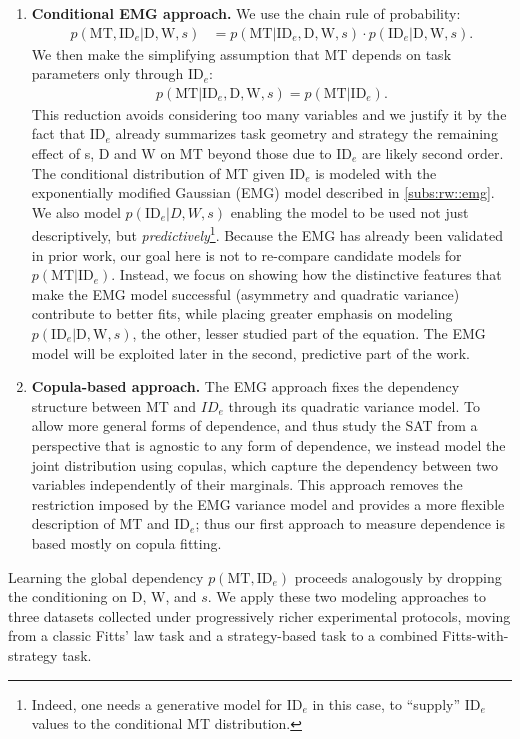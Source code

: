 \documentclass[acmlarge, manuscript,review]{acmart}
\newcommand{\mt}{\ensuremath{{\text{MT}}}\xspace}
\newcommand{\ide}{\ensuremath{{\text{ID}_e}}\xspace}
\newcommand{\D}{\ensuremath{{\text{D}}}\xspace}
\newcommand{\W}{\ensuremath{{\text{W}}}\xspace}
\begin{document}
\begin{enumerate}
	\item \textbf{Conditional EMG approach.}  
	We use the chain rule of probability:
	\begin{align}
		p(\mt, \ide | \D, \W, s) 
		&= p(\mt | \ide, \D, \W, s) \cdot{} p(\ide | \D, \W, s).\label{eq:chain_rule}
	\end{align}
	We then make the simplifying assumption that MT depends on task parameters only through \ide:
	\begin{align}
		p(\mt | \ide, \D, \W, s) = p(\mt | \ide).
	\end{align}
	This reduction avoids considering too many variables and we justify it by the fact that \ide already summarizes task geometry and strategy \ie the remaining effect of s, \D and \W on MT beyond those due to \ide are likely second order. 
	The conditional distribution of MT given \ide is modeled with the exponentially modified Gaussian (EMG) model described in \autoref{subs:rw::emg}. 
	We also model \(p(\ide | D, W, s)\) enabling the model to be used not just descriptively, but \textit{predictively}\footnote{Indeed, one needs a generative model for \ide in this case, to ``supply'' \ide values to the conditional MT distribution.}.
	Because the EMG has already been validated in prior work, our goal here is not to re-compare candidate models for $p(\mt|\ide)$. Instead, we focus on showing how the distinctive features that make the EMG model successful (asymmetry and quadratic variance) contribute to better fits, while placing greater emphasis on modeling $p(\ide| \D,\W,s)$, the other, lesser studied part of the equation. The EMG model will be exploited later in the second, predictive part of the work.
	
	\item \textbf{Copula-based approach.}  
	The EMG approach fixes the dependency structure between MT and \(ID_e\) through its quadratic variance model. 
	To allow more general forms of dependence, and thus study the SAT from a perspective that is agnostic to any form of dependence, we instead model the joint distribution using copulas, which capture the dependency between two variables independently of their marginals. 
	This approach removes the restriction imposed by the EMG variance model and provides a more flexible description of MT and \ide; thus our first approach to measure dependence is based mostly on copula fitting.
\end{enumerate}
\noindent Learning the global dependency \(p(\mt, \ide)\) proceeds analogously by dropping the conditioning on \D, \W, and $s$.
We apply these two modeling approaches to three datasets collected under progressively richer experimental protocols, moving from a classic Fitts' law task and a strategy-based task to a combined Fitts-with-strategy task.
\end{document}
